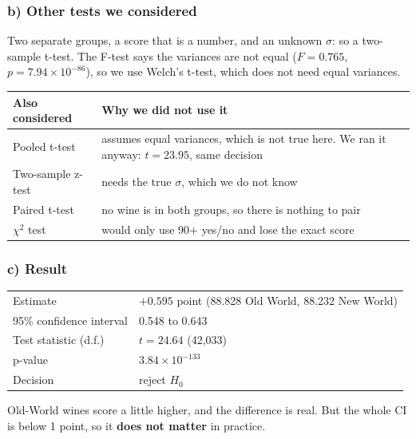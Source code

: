 \documentclass[10pt,a4paper,twocolumn]{article}
\newif\ifshowhints
\newcommand{\hint}[1]{\ifshowhints\par{\color{gray}\itshape\small #1\par}\fi}
\begin{document}
\subsubsection*{b) Other tests we considered}
\hint{Which other tests did you consider, and why did you not use them? Say first why your test fits your data.}
Two separate groups, a score that is a number, and an unknown $\sigma$: so a two-sample t-test. The F-test says the
variances are not equal ($F = 0.765$, $p = 7.94 \times 10^{-86}$), so we use Welch's t-test, which does not need equal
variances.

{\footnotesize
\begin{tabularx}{\columnwidth}{@{}P{23mm}L@{}}
\toprule
\textbf{Also considered} & \textbf{Why we did not use it}\\
\midrule
Pooled t-test & assumes equal variances, which is not true here. We ran it anyway: $t = 23.95$, same decision\\
Two-sample z-test & needs the true $\sigma$, which we do not know\\
Paired t-test & no wine is in both groups, so there is nothing to pair\\
$\chi^2$ test & would only use 90+ yes/no and lose the exact score\\
\bottomrule
\end{tabularx}\par}

\subsubsection*{c) Result}
\hint{Report the test statistic, degrees of freedom, p-value and decision, and the estimate with a 95\% confidence
interval. Is the difference large enough to matter?}
{\small
\begin{tabularx}{\columnwidth}{@{}HL@{}}
\toprule
Estimate & $+0.595$ point (88.828 Old World, 88.232 New World)\\
95\% confidence interval & 0.548 to 0.643\\
Test statistic (d.f.) & $t = 24.64$ (42,033)\\
p-value & $3.84 \times 10^{-133}$\\
Decision & reject $H_0$\\
\bottomrule
\end{tabularx}\par}

Old-World wines score a little higher, and the difference is real. But the whole CI is below 1 point, so it
\textbf{does not matter} in practice.
\end{document}
